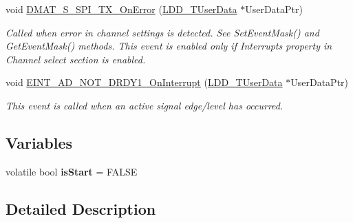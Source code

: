 \begin{DoxyCompactItemize}
void \hyperlink{group___events__module_ga9eed688c4eacb771ba10300b98abcb0f}{D\-M\-A\-T\-\_\-\-S\-\_\-\-S\-P\-I\-\_\-\-T\-X\-\_\-\-On\-Error} (\hyperlink{group___p_e___types__module_ga0b66a73f87238a782318aa0be7578e35}{L\-D\-D\-\_\-\-T\-User\-Data} $\ast$User\-Data\-Ptr)
\begin{DoxyCompactList}\small\item\em Called when error in channel settings is detected. See Set\-Event\-Mask() and Get\-Event\-Mask() methods. This event is enabled only if Interrupts property in Channel select section is enabled. \end{DoxyCompactList}\item 
void \hyperlink{group___events__module_gae1c716eeadc2c10887b42dacac33de1f}{E\-I\-N\-T\-\_\-\-A\-D\-\_\-\-N\-O\-T\-\_\-\-D\-R\-D\-Y1\-\_\-\-On\-Interrupt} (\hyperlink{group___p_e___types__module_ga0b66a73f87238a782318aa0be7578e35}{L\-D\-D\-\_\-\-T\-User\-Data} $\ast$User\-Data\-Ptr)
\begin{DoxyCompactList}\small\item\em This event is called when an active signal edge/level has occurred. \end{DoxyCompactList}\end{DoxyCompactItemize}
\subsection*{Variables}
\begin{DoxyCompactItemize}
\item 
\hypertarget{group___events__module_gae2271189dea2220fcee9b0af8941bde3}{volatile bool {\bfseries is\-Start} = F\-A\-L\-S\-E}\label{group___events__module_gae2271189dea2220fcee9b0af8941bde3}

\end{DoxyCompactItemize}


\subsection{Detailed Description}


